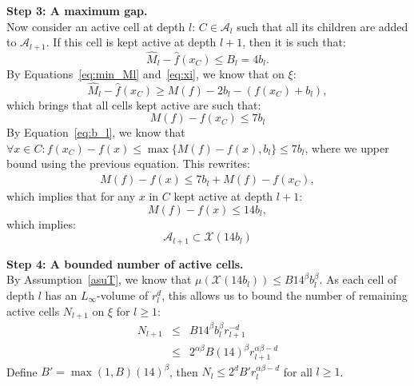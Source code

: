 \documentclass[final,12pt]{colt2018}
\begin{document}
\textbf{Step 3: A maximum gap.}\\
Now consider an active cell at depth $l$: $C \in \mathcal{A}_l$ such that all its children are added to $\mathcal{A}_{l+1}$. If this cell is kept active at depth $l+1$, then it is such that: $$\widehat{M}_l - \widehat{f}(x_C) \leq B_l = 4b_l.$$
By Equations~\eqref{eq:min_Ml} and~\eqref{eq:xi}, we know that on $\xi$:
$$
\widehat{M}_l - \widehat{f}(x_C) \geq M(f) - 2b_l - (f(x_C) + b_l),
$$
which brings that all cells kept active are such that:
\begin{equation*}
M(f) - f(x_C) \leq 7 b_l
\end{equation*}
By Equation~\eqref{eq:b_l}, we know that $\forall x \in C: f(x_C) - f(x) \leq \max\{M(f) - f(x), b_l\} \leq 7 b_l$, where we upper bound using the previous equation. This rewrites:
\begin{eqnarray*}
M(f) - f(x) \leq 7 b_l + M(f) - f(x_C),
\end{eqnarray*}
which implies that for any $x$ in $C$ kept active at depth $l+1$:
\begin{equation}\label{eq:max_gap}
M(f) - f(x) \leq 14 b_l,
\end{equation}
which implies:
\begin{equation}\label{eq:subset}
\mathcal{A}_{l+1} \subset \mathcal X(14 b_l) 
\end{equation}

\textbf{Step 4: A bounded number of active cells.}\\
By Assumption~\ref{asuT}, we know that $\mu(\mathcal X(14 b_l)) \leq B 14^\beta b_l^\beta$. As each cell of depth $l$ has an $L_\infty$-volume of $r_l^{d}$, this allows us to bound the number of remaining active cells $N_{l+1}$ on $\xi$ for $l\geq 1$:
\begin{eqnarray}\label{eq:bd_N_l}
N_{l+1} & \leq & B 14^\beta b_l^\beta r_{l+1}^{-d} \nonumber \\
& \leq & 2^{\alpha \beta} B (14)^\beta  r_{l+1}^{\alpha\beta -d}
\end{eqnarray}
Define $B' = \max(1,B) (14)^\beta$, then $N_l \leq 2^d B'r_l^{\alpha\beta -d}$ for all $l \geq 1$.\\
\end{document}

